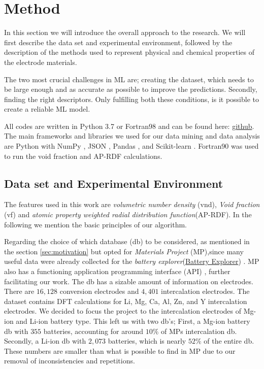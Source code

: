 \section{Method}
	In this section we will introduce the overall approach to the research. We will first describe the data set and experimental environment, followed by the description of the methods used to represent physical and chemical properties of the electrode materials.

	The two most crucial challenges in ML are; creating the dataset, which needs to be large enough and as accurate as possible to improve the predictions. Secondly, finding the right descriptors. Only fulfilling both these conditions, is it possible to create a reliable ML model. 
	
	All codes are written in Python 3.7 \cite{van1995python} or Fortran98 \cite{backus1964fortran} and can be found here: \href{https://github.com/sondrt/Machine-Learning-the-Voltage-Capacity-and-Energy-density-of-Electrode-Materials}{github}. The main frameworks and libraries we used for our data mining and data analysis are Python with NumPy \cite{oliphant2006guide}, JSON \cite{pezoa2016foundations}, Pandas \cite{mckinney-proc-scipy-2010}, and Scikit-learn \cite{scikit-learn}.
Fortran90 was used to run the void fraction and AP-RDF calculations. 

\subsection{Data set and Experimental Environment}\label{sec:experimentalenv}
	 The features used in this work are \textit{volumetric number density} (\ac{vnd}), \textit{Void fraction} (\ac{vf}) and \textit{atomic property weighted radial distribution function}(\ac{AP-RDF}). In the following we mention the basic principles of our algorithm. 

	 Regarding the choice of which database (\ac{db}) to be considered, as mentioned in the section \ref{sec:motivation} but opted for \textit{Materials Project} \cite{Jain2013} \cite{doi:10.1038/sdata.2015.9} (\ac{MP}),since many useful data were already collected for  the \textit{battery explorer}(\href{www.materialsproject.org/batteries}{Battery Explorer}) \cite{Zhou2004a} \cite{Adams2011a}. MP also has a functioning application programming interface (\ac{API}) \cite{Ong_2015}, further facilitating our work. The db has a sizable amount of information on electrodes. There are $16,128$ conversion electrodes and $4,401$ intercalation electrodes. The dataset contains DFT calculations for Li, Mg, Ca, Al, Zn, and Y intercalation electrodes. We decided to focus the project to the intercalation electrodes of Mg-ion and Li-ion battery type. This left us with two db's; First, a Mg-ion battery db with $355$ batteries, accounting for around $10\%$ of  MPs intercalation db. Secondly, a Li-ion db with $2,073$ batteries, which is nearly $52\%$ of the entire db. These numbers are smaller than what is possible to find in MP due to our removal of inconsistencies and repetitions.
	 
